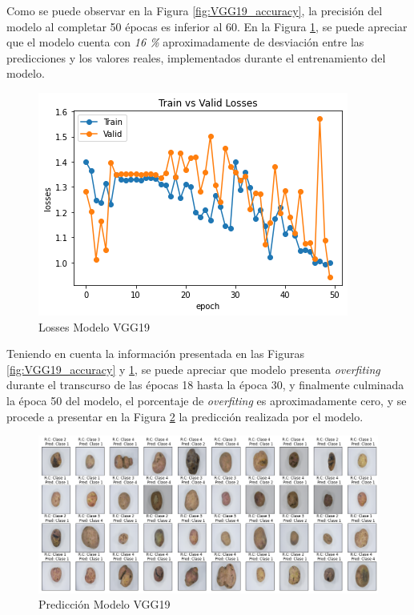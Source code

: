 				Como se puede observar en la Figura \ref{fig:VGG19_accuracy}, la precisión del modelo al completar 50 épocas es inferior al 60. 	
				En la Figura \ref{fig:VGG19_losses}, se puede apreciar que el modelo cuenta con \textit{16 \%} aproximadamente de desviación entre las predicciones y los valores reales, implementados durante el entrenamiento del modelo.
				
				\begin{figure}[ht]
					\centering
					\includegraphics[scale=0.55]{Figs/102.png}
					\caption{Losses Modelo VGG19}
					\label{fig:VGG19_losses}
				\end{figure}
			
			Teniendo en cuenta la información presentada en las Figuras \ref{fig:VGG19_accuracy} y \ref{fig:VGG19_losses}, se puede apreciar que modelo presenta \textit{overfiting} durante el transcurso de las épocas 18 hasta la época 30, y finalmente culminada la época 50 del modelo, el porcentaje de \textit{overfiting} es aproximadamente cero, y se procede a presentar en la Figura \ref*{fig:VGG19_prediccion} la predicción realizada por el modelo.
			
			\begin{figure}[ht]
				\centering
				\includegraphics[scale=0.35]{Figs/103.png}
				\caption{Predicción Modelo VGG19}
				\label{fig:VGG19_prediccion}
			\end{figure}
		
